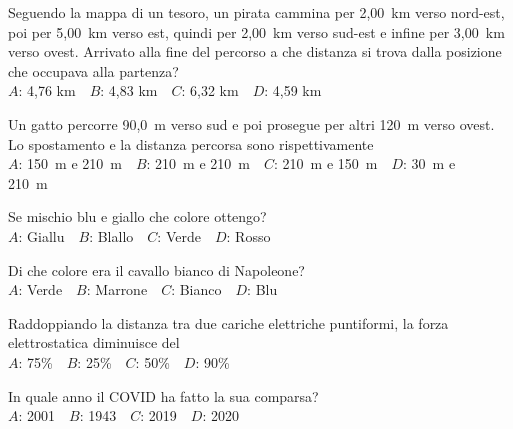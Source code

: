 \mcquestionheader Seguendo la mappa di un tesoro, un pirata cammina per 2,00~km verso nord-est, poi per 5,00~km verso est, quindi per 2,00~km verso sud-est e infine per 3,00~km verso ovest. Arrivato alla fine del percorso a che distanza si trova dalla posizione che occupava alla partenza?\\
{$A$}: 4,76 km\ \ {$B$}: 4,83 km\ \ {$C$}: 6,32 km\ \ {$D$}: 4,59 km\ \ 

\mcquestionfooter



\def\mcquestionnumber{12}


\mcquestionheader Un gatto percorre 90,0~m verso sud e poi prosegue per altri 120~m verso ovest. Lo spostamento e la distanza percorsa sono rispettivamente\\
{$A$}: 150~m e 210~m\ \ {$B$}: 210~m e 210~m\ \ {$C$}: 210~m e 150~m\ \ {$D$}: 30~m e 210~m\ \ 

\mcquestionfooter



\mcpaperfooter

\def\mcserialnumber{11}
\mcpaperheader


\def\mcquestionnumber{1}


\mcquestionheader Se mischio blu e giallo che colore ottengo?\\
{$A$}: Giallu\ \ {$B$}: Blallo\ \ {$C$}: Verde\ \ {$D$}: Rosso\ \ 

\mcquestionfooter



\def\mcquestionnumber{2}


\mcquestionheader Di che colore era il cavallo bianco di Napoleone?\\
{$A$}: Verde\ \ {$B$}: Marrone\ \ {$C$}: Bianco\ \ {$D$}: Blu\ \ 

\mcquestionfooter



\def\mcquestionnumber{3}


\mcquestionheader Raddoppiando la distanza tra due cariche elettriche puntiformi, la forza elettrostatica diminuisce del\\
{$A$}: 75\%\ \ {$B$}: 25\%\ \ {$C$}: 50\%\ \ {$D$}: 90\%\ \ 

\mcquestionfooter



\def\mcquestionnumber{4}


\mcquestionheader In quale anno il COVID ha fatto la sua comparsa?\\
{$A$}: 2001\ \ {$B$}: 1943\ \ {$C$}: 2019\ \ {$D$}: 2020\ \ 

